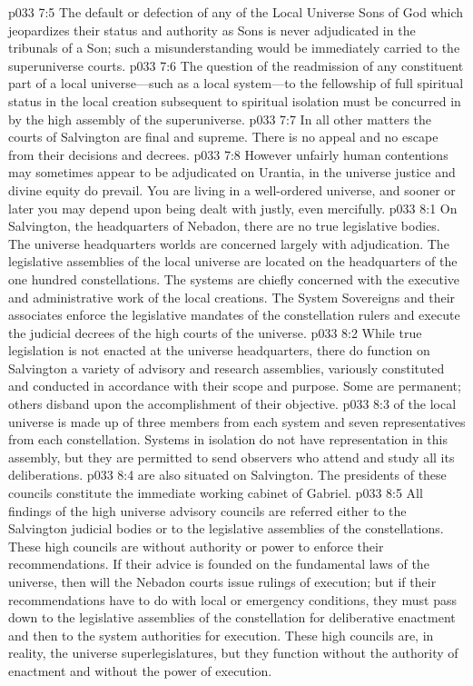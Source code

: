 \pc \vs p033 7:5 \bibnobreakspace The default or defection of any of the Local Universe Sons of God which jeopardizes their status and authority as Sons is never adjudicated in the tribunals of a Son; such a misunderstanding would be immediately carried to the superuniverse courts.
\pc \vs p033 7:6 \bibnobreakspace The question of the readmission of any constituent part of a local universe---such as a local system---to the fellowship of full spiritual status in the local creation subsequent to spiritual isolation must be concurred in by the high assembly of the superuniverse.
\pc \vs p033 7:7 In all other matters the courts of Salvington are final and supreme. There is no appeal and no escape from their decisions and decrees.
\vs p033 7:8 However unfairly human contentions may sometimes appear to be adjudicated on Urantia, in the universe justice and divine equity do prevail. You are living in a well\hyp{}ordered universe, and sooner or later you may depend upon being dealt with justly, even mercifully.
\vs p033 8:1 On Salvington, the headquarters of Nebadon, there are no true legislative bodies. The universe headquarters worlds are concerned largely with adjudication. The legislative assemblies of the local universe are located on the headquarters of the one hundred constellations. The systems are chiefly concerned with the executive and administrative work of the local creations. The System Sovereigns and their associates enforce the legislative mandates of the constellation rulers and execute the judicial decrees of the high courts of the universe.
\vs p033 8:2 While true legislation is not enacted at the universe headquarters, there do function on Salvington a variety of advisory and research assemblies, variously constituted and conducted in accordance with their scope and purpose. Some are permanent; others disband upon the accomplishment of their objective.
\pc \vs p033 8:3  of the local universe is made up of three members from each system and seven representatives from each constellation. Systems in isolation do not have representation in this assembly, but they are permitted to send observers who attend and study all its deliberations.
\pc \vs p033 8:4  are also situated on Salvington. The presidents of these councils constitute the immediate working cabinet of Gabriel.\plusone
\pc \vs p033 8:5 All findings of the high universe advisory councils are referred either to the Salvington judicial bodies or to the legislative assemblies of the constellations. These high councils are without authority or power to enforce their recommendations. If their advice is founded on the fundamental laws of the universe, then will the Nebadon courts issue rulings of execution; but if their recommendations have to do with local or emergency conditions, they must pass down to the legislative assemblies of the constellation for deliberative enactment and then to the system authorities for execution. These high councils are, in reality, the universe superlegislatures, but they function without the authority of enactment and without the power of execution.
